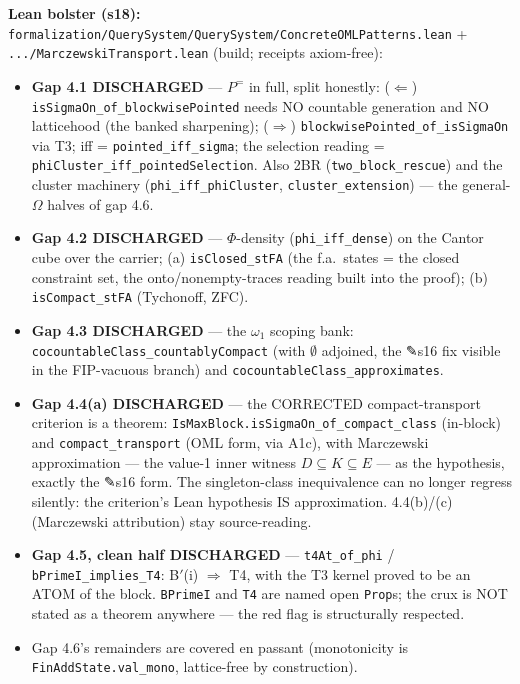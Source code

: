\documentclass[11pt]{article}
\newcommand{\file}[1]{\texttt{\small #1}}
\begin{document}
\smallskip\noindent\textbf{Lean bolster (s18):}
\file{formalization/QuerySystem/QuerySystem/ConcreteOMLPatterns.lean} +
\file{.../MarczewskiTransport.lean} (build; receipts axiom-free):
\begin{itemize}[leftmargin=2em]
\item \textbf{Gap 4.1 DISCHARGED} --- $P^=$ in full, split honestly:
  ($\Leftarrow$) \texttt{isSigmaOn\_of\_blockwisePointed} needs NO
  countable generation and NO latticehood (the banked sharpening);
  ($\Rightarrow$) \texttt{blockwisePointed\_of\_isSigmaOn} via T3;
  iff = \texttt{pointed\_iff\_sigma}; the selection reading =
  \texttt{phiCluster\_iff\_pointedSelection}. Also 2BR
  (\texttt{two\_block\_rescue}) and the cluster machinery
  (\texttt{phi\_iff\_phiCluster}, \texttt{cluster\_extension}) --- the
  general-$\Omega$ halves of gap 4.6.
\item \textbf{Gap 4.2 DISCHARGED} --- $\Phi$-density
  (\texttt{phi\_iff\_dense}) on the Cantor cube over the carrier;
  (a) \texttt{isClosed\_stFA} (the f.a.\ states = the closed constraint
  set, the onto/nonempty-traces reading built into the proof);
  (b) \texttt{isCompact\_stFA} (Tychonoff, ZFC).
\item \textbf{Gap 4.3 DISCHARGED} --- the $\omega_1$ scoping bank:
  \texttt{cocountableClass\_countablyCompact} (with $\emptyset$
  adjoined, the ✎s16 fix visible in the FIP-vacuous branch) and
  \texttt{cocountableClass\_approximates}.
\item \textbf{Gap 4.4(a) DISCHARGED} --- the CORRECTED
  compact-transport criterion is a theorem:
  \texttt{IsMaxBlock.isSigmaOn\_of\_compact\_class} (in-block) and
  \texttt{compact\_transport} (OML form, via A1c), with Marczewski
  approximation --- the value-1 inner witness $D \subseteq K \subseteq
  E$ --- as the hypothesis, exactly the ✎s16 form. The
  singleton-class inequivalence can no longer regress silently: the
  criterion's Lean hypothesis IS approximation. 4.4(b)/(c)
  (Marczewski attribution) stay source-reading.
\item \textbf{Gap 4.5, clean half DISCHARGED} --- \texttt{t4At\_of\_phi}
  / \texttt{bPrimeI\_implies\_T4}: B$'$(i) $\Rightarrow$ T4, with the
  T3 kernel proved to be an ATOM of the block. \texttt{BPrimeI} and
  \texttt{T4} are named open \texttt{Prop}s; the crux is NOT stated as
  a theorem anywhere --- the red flag is structurally respected.
\item Gap 4.6's remainders are covered en passant (monotonicity is
  \texttt{FinAddState.val\_mono}, lattice-free by construction).
\end{itemize}
\end{document}
